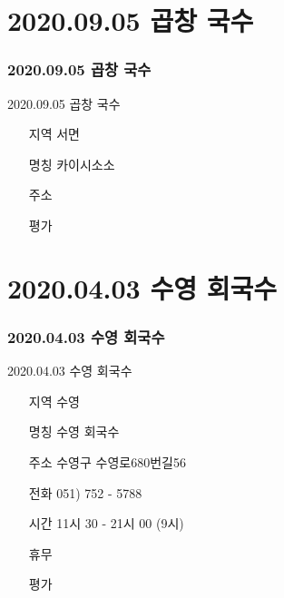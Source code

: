 \documentclass[aspectratio=1610,17pt,xcolor=pdftex,dvipsnames,table,handout]{beamer}
\begin{document}
		\section{ 2020.09.05 곱창 국수 }
		\begin{frame} [t,plain]
		\frametitle{ 2020.09.05 곱창 국수 }
			\begin{block} { 2020.09.05 곱창 국수 }
			\setlength{\leftmargini}{4em}			
			\begin{itemize}
				\item [지역] 서면
				\item [명칭] 카이시소소
				\item [주소] 
				\item [평가] 
			\end{itemize}
			\end{block}						
		\end{frame}						


		\section{ 2020.04.03 수영 회국수 }
		\begin{frame} [t,plain]
		\frametitle{ 2020.04.03 수영 회국수 }
			\begin{block} { 2020.04.03 수영 회국수 }
			\setlength{\leftmargini}{4em}			
			\begin{itemize}
				\item [지역] 수영 
				\item [명칭] 수영 회국수
				\item [주소] 수영구 수영로680번길56
				\item [전화] 051) 752 - 5788
				\item [시간] 11시 30 - 21시 00 (9시)
				\item [휴무] 
				\item [평가] 
			\end{itemize}
			\end{block}						
		\end{frame}						


\end{document}
